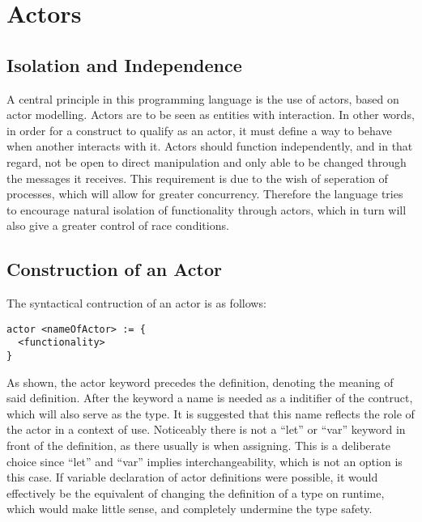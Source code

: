 \section{Actors}





\subsection{Isolation and Independence}

A central principle in this programming language is the use of actors, based on actor modelling. Actors are to be seen as entities with interaction. In other words, in order for a construct to qualify as an actor, it must define a way to behave when another interacts with it. Actors should function independently, and in that regard, not be open to direct manipulation and only able to be changed through the messages it receives. This requirement is due to the wish of seperation of processes, which will allow for greater concurrency. Therefore the language tries to encourage natural isolation of functionality through actors, which in turn will also give a greater control of race conditions.

\subsection{Construction of an Actor}

The syntactical contruction of an actor is as follows:

\begin{lstlisting}
actor <nameOfActor> := {
  <functionality>
}
\end{lstlisting}

As shown, the actor keyword precedes the definition, denoting the meaning of said definition. After the keyword a name is needed as a inditifier of the contruct, which will also serve as the type. It is suggested that this name reflects the role of the actor in a context of use. Noticeably there is not a \enquote{let} or \enquote{var} keyword in front of the definition, as there usually is when assigning. This is a deliberate choice since \enquote{let} and \enquote{var} implies interchangeability, which is not an option is this case. If variable declaration of actor definitions were possible, it would effectively be the equivalent of changing the definition of a type on runtime, which would make little sense, and completely undermine the type safety.


